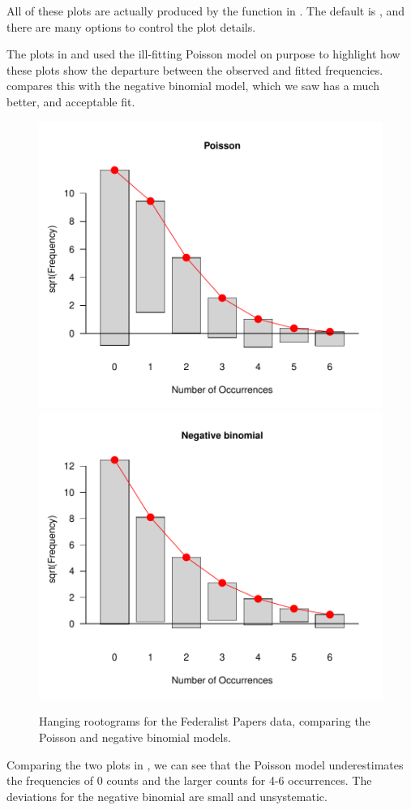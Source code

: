 \documentclass[11pt]{book}
\renewenvironment{knitrout}{\small\renewcommand{\baselinestretch}{.85}}{} %
\begin{document}
All of these plots are actually produced by the  function
in .  The default is , and there are many
options to control the plot details.

The plots in  and 
used the ill-fitting Poisson model on purpose to highlight how these
plots show the departure between the observed and fitted frequencies.
 compares this with the negative
binomial model,  which we saw has a much better, and acceptable
fit.
\begin{knitrout}
\color{fgcolor}\begin{kframe}
\begin{alltt}
 \hlstd{=}\hlstd{)}
 \hlstd{=}\hlstd{)}
\end{alltt}
\end{kframe}\begin{figure}[!htbp]


\centerline{\includegraphics[width=.48\textwidth]{ch03/fig/Fed0-Fed11} 
\includegraphics[width=.48\textwidth]{ch03/fig/Fed0-Fed12} }

\caption[Hanging rootograms for the Federalist Papers data, comparing the Poisson and negative binomial models]{Hanging rootograms for the Federalist Papers data, comparing the Poisson and negative binomial models.\label{fig:Fed0-Fed1}}
\end{figure}


\end{knitrout}
Comparing the two plots in , we can see that the Poisson model underestimates the frequencies of 0 counts and the larger counts for 4-6 occurrences.
The deviations for the negative binomial are small and unsystematic.
\end{document}

